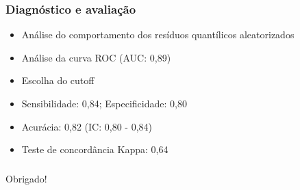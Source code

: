 \documentclass{beamer}
\begin{document}
\begin{frame}
    \frametitle{Diagnóstico e avaliação}
    \begin{itemize}
        \item Análise do comportamento dos resíduos quantílicos aleatorizados
        \item Análise da curva ROC (AUC: 0,89)
        \item Escolha do cutoff
        \item Sensibilidade: 0,84; Especificidade: 0,80
        \item Acurácia: 0,82 (IC: 0,80 - 0,84)
        \item Teste de concordância Kappa: 0,64
    \end{itemize}
\end{frame}

\begin{frame}
    \frametitle{}
    \centering Obrigado!
\end{frame}
\end{document}
